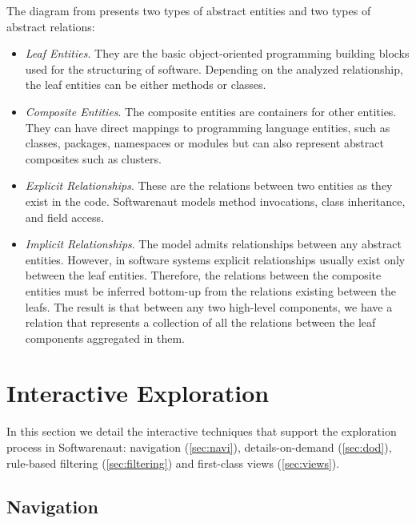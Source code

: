 \documentclass[preprint,12pt]{elsarticle}
\begin{document}
The diagram from  presents two types of abstract entities and two types of abstract relations:

\begin{itemize}

\item {\em Leaf Entities}. They are the basic object-oriented programming building blocks used for the structuring of software. Depending on the analyzed relationship, the leaf entities can be either methods or classes.

\item {\em Composite Entities}. The composite entities are containers for other entities. They can have direct mappings to programming language entities, such as classes, packages, namespaces or modules but can also represent abstract composites such as clusters.

\item {\em Explicit Relationships}. These are the relations between two entities as they exist in the code. Softwarenaut models method invocations, class inheritance, and field access.

\item {\em Implicit Relationships}. The model admits relationships between any abstract entities. However, in software systems explicit relationships usually exist only between the leaf entities. Therefore, the relations between the composite entities must be inferred bottom-up from the relations existing between the leafs. The result is that between any two high-level components, we have a relation that represents a collection of all the relations between the leaf components aggregated in them.

\end{itemize}

\section {Interactive Exploration} \label {sec:interact}

In this section we detail the interactive techniques that support the exploration process in Softwarenaut: navigation (\ref{sec:navi}), details-on-demand (\ref{sec:dod}), rule-based filtering (\ref{sec:filtering}) and first-class views (\ref{sec:views}).  

\subsection{Navigation} 
\end{document}
